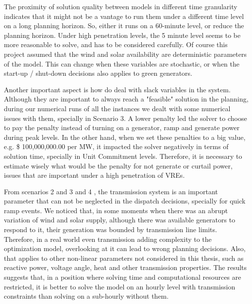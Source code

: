 \documentclass[12pt,LUDisStyle,twosided]{book}
\begin{document}
The proximity of solution quality between models in different time granularity indicates that it might not be a vantage to run them under a different time level on a long planning horizon. So, either it runs on a 60-minute level, or reduce the planning horizon. Under high penetration levels, the 5 minute level seems to be more reasonable to solve, and has to be considered carefully. Of course this project assumed that the wind and solar availability are deterministic parameters of the model. This can change when these variables are stochastic, or when the start-up / shut-down decisions also applies to green generators.

Another important aspect is how do deal with slack variables in the system. Although they are important to always reach a "feasible" solution in the planning, during our numerical runs of all the instances we dealt with some numerical issues with them, specially in Scenario 3. A lower penalty led the solver to choose to pay the penalty instead of turning on a generator, ramp and generate power during peak levels. In the other hand, when we set these penalties to a big value, e.g. \$ 100,000,000.00 per MW, it impacted the solver negatively in terms of solution time, specially in Unit Commitment levels. Therefore, it is necessary to estimate wisely what would be the penalty for not generate or curtail power, issues that are important under a high penetration of VREs.

From scenarios 2 and 3 and 4 , the transmission system is an important parameter that can not be neglected in the dispatch decisions, specially for quick ramp events. We noticed that, in some moments when there was an abrupt variation of wind and solar     supply, although there was available generators to respond to it, their generation was bounded by transmission line limits. Therefore, in a real world even transmission adding complexity to the optimization model, overlooking at it can lead to wrong planning decisions. Also, that applies to other non-linear parameters not considered in this thesis, such as reactive power, voltage angle, heat and other transmission properties. The results suggests that, in a position where solving time and computational resources are restricted, it is better to solve the model on an hourly level with transmission constraints than solving on a sub-hourly without them.
\end{document}
